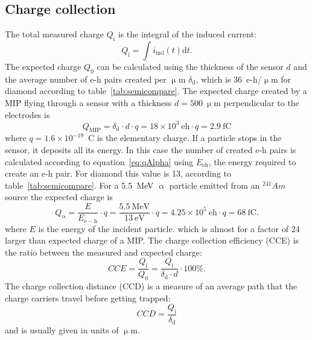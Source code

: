 \subsection{Charge collection}
The total measured charge $Q_\mathrm{i}$ is the integral of the induced current:
\begin{equation}
Q_\mathrm{i}=\int i_\mathrm{ind}(t) \mathrm{d}t.
\end{equation}
The expected charge $Q_\mathrm{0}$ can be calculated using the thickness of the sensor $d$ and the average number of e-h pairs created per $\upmu$m $\delta_\mathrm{d}$, which is 36~e-h/$\upmu$m for diamond according to table~\ref{tab:semicompare}. 
The expected charge created by a MIP flying through a sensor with a thickness $d=500~\upmu$m perpendicular to the electrodes is
\begin{equation}
\label{eq:qBeta}
Q_\mathrm{MIP}=\delta_\mathrm{d}\cdot d \cdot q = 18\times10^3~\mathrm{eh} \cdot q = 2.9~\mathrm{fC}
\end{equation}
where $q=1.6\times10^{-19}$~C is the elementary charge.
If a particle stops in the sensor, it deposits all its energy. In this case the number of created e-h pairs is calculated according to equation~\ref{eq:qAlpha} using $E_\mathrm{eh}$, the energy required to create an e-h pair. For diamond this value is 13, according to table~\ref{tab:semicompare}. For a 5.5~MeV $\upalpha$ particle emitted from an $^{241}Am$ source the expected charge is
\begin{equation}
\label{eq:qAlpha}
Q_\upalpha = \frac{E}{E_\mathrm{e-h}} \cdot q = \frac{5.5~\mathrm{MeV}}{13~\mathrm{eV}} \cdot q = 4.25\times10^5~\mathrm{eh} \cdot q = 68~\mathrm{fC}.
\end{equation}
where $E$ is the energy of the incident particle.
which is almost for a factor of 24 larger than expected charge of a MIP. The charge collection efficiency (CCE) is the ratio between the measured and expected charge:
\begin{equation}
\label{eq:ccecalc1}
CCE = \frac{Q_\mathrm{i}}{Q_\mathrm{0}} = \frac{Q_\mathrm{i}}{\delta_\mathrm{d}\cdot d}\cdot100\%.
\end{equation}
The charge collection distance (CCD) is a measure of an average path that the charge carriers travel before getting trapped:
\begin{equation}
\label{eq:ccdcalc1}
CCD = \frac{Q_\mathrm{i}}{\delta_\mathrm{d}}
\end{equation}
and is usually given in units of $\upmu$m.

